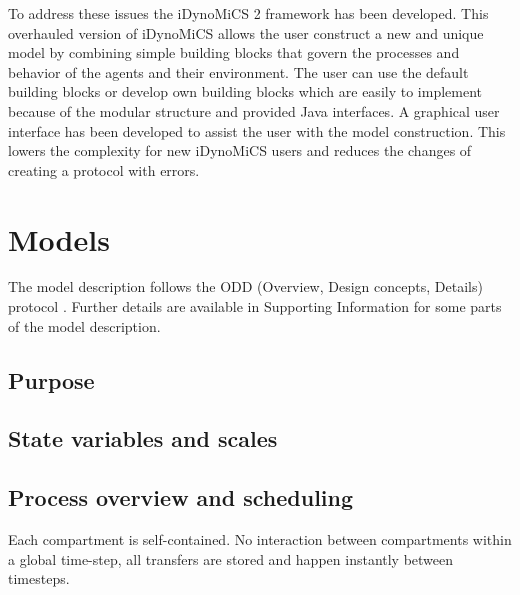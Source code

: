 \documentclass[10pt,letterpaper]{article}
\begin{document}
To address these issues the iDynoMiCS 2 framework has been developed. This overhauled version of iDynoMiCS allows the user construct a new and unique model by combining simple building blocks that govern the processes and behavior of the agents and their environment. The user can use the default building blocks or develop own building blocks which are easily to implement because of the modular structure and provided Java interfaces. A graphical user interface has been developed to assist the user with the model construction. This lowers the complexity for new iDynoMiCS users and reduces the changes of creating a protocol with errors.


\section*{Models}
The model description follows the ODD (Overview, Design concepts, Details) protocol \cite{Grimm2006, Grimm2010}. Further details are available in Supporting Information for some parts of the model description.

\subsection*{Purpose}


\subsection*{State variables and scales}


\subsection*{Process overview and scheduling}
Each compartment is self-contained.
No interaction between compartments within a global time-step, all transfers are stored and happen instantly between timesteps.
\end{document}
